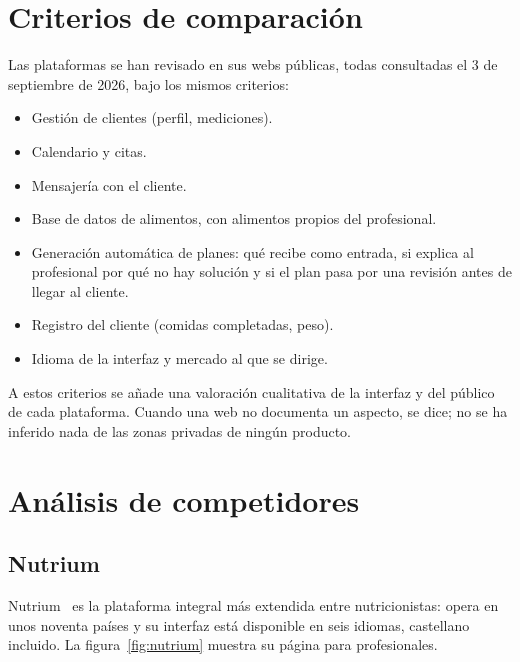 \section{Criterios de comparación}
\label{sec:criterios-competencia}

Las plataformas se han revisado en sus webs públicas, todas consultadas el 3 de septiembre de 2026, bajo los mismos criterios:

\begin{itemize}
    \item Gestión de clientes (perfil, mediciones).
    \item Calendario y citas.
    \item Mensajería con el cliente.
    \item Base de datos de alimentos, con alimentos propios del profesional.
    \item Generación automática de planes: qué recibe como entrada, si explica al profesional por qué no hay solución y si el plan pasa por una revisión antes de llegar al cliente.
    \item Registro del cliente (comidas completadas, peso).
    \item Idioma de la interfaz y mercado al que se dirige.
\end{itemize}

A estos criterios se añade una valoración cualitativa de la interfaz y del público de cada plataforma. Cuando una web no documenta un aspecto, se dice; no se ha inferido nada de las zonas privadas de ningún producto.

\section{Análisis de competidores}
\label{sec:competidores}

\subsection{Nutrium}

Nutrium~\citep{nutrium} es la plataforma integral más extendida entre nutricionistas: opera en unos noventa países y su interfaz está disponible en seis idiomas, castellano incluido. La figura~\ref{fig:nutrium} muestra su página para profesionales.

